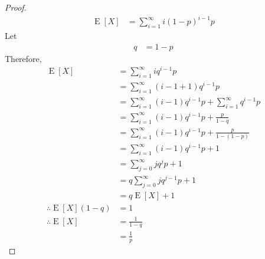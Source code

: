 \documentclass[titlepage, fleqn, a4paper, 12pt, twoside]{article}
\theoremstyle{definition}
\theoremstyle{theorem}
\DeclareMathOperator{\expct}{\mathrm{E}}
\begin{document}
\begin{proof}
	\begin{align*}
		\expct[X] & = \sum\limits_{i = 1}^{\infty} i (1 - p)^{i - 1} p
	\end{align*}
	Let
	\begin{align*}
		q & = 1 - p
	\end{align*}
	Therefore,
	\begin{align*}
		\expct[X]                    & = \sum\limits_{i = 1}^{\infty} i q^{i - 1} p                                                  \\
                                             & = \sum\limits_{i = 1}^{\infty} (i - 1 + 1) q^{i - 1} p                                        \\
                                             & = \sum\limits_{i = 1}^{\infty} (i - 1) q^{i - 1} p + \sum\limits_{i = 1}^{\infty} q^{i - 1} p \\
                                             & = \sum\limits_{i = 1}^{\infty} (i - 1) q^{i - 1} p + \frac{p}{1 - q}                          \\
                                             & = \sum\limits_{i = 1}^{\infty} (i - 1) q^{i - 1} p + \frac{p}{1 - (1 - p)}                    \\
                                             & = \sum\limits_{i = 1}^{\infty} (i - 1) q^{i - 1} p + 1                                        \\
                                             & = \sum\limits_{j = 0}^{\infty} j q^j p + 1                                                    \\
                                             & = q \sum\limits_{j = 0}^{\infty} j q^{j - 1} p + 1                                            \\
                                             & = q \expct[X] + 1                                                                             \\
		\therefore \expct[X] (1 - q) & = 1                                                                                           \\
		\therefore \expct[X]         & = \frac{1}{1 - q}                                                                             \\
                                             & = \frac{1}{p}
	\end{align*}
\end{proof}
\end{document}
